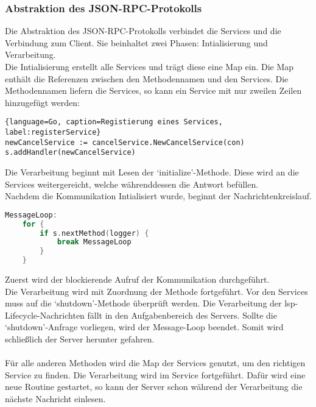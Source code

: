 \documentclass[./einleitung.tex]{subfiles}
\begin{document}
    \subsubsection{Abstraktion des JSON-RPC-Protokolls}
    Die Abstraktion des JSON-RPC-Protokolls verbindet die Services und die Verbindung zum Client.
    Sie beinhaltet zwei Phasen: Intialisierung und Verarbeitung.\\
    Die Intialisierung erstellt alle Services und trägt diese eine Map ein.
    Die Map enthält die Referenzen zwischen den Methodennamen und den Services.
    Die Methodennamen liefern die Services, so kann ein Service mit nur zweilen Zeilen hinzugefügt werden:
    \begin{lstlisting}{language=Go, caption=Registierung eines Services, label:registerService}
newCancelService := cancelService.NewCancelService(con)
s.addHandler(newCancelService)
    \end{lstlisting}
    Die Verarbeitung beginnt mit Lesen der `initialize'-Methode.
    Diese wird an die Services weitergereicht, welche währenddessen die Antwort befüllen.\\
    Nachdem die Kommunikation Intialisiert wurde, beginnt der Nachrichtenkreislauf.
    \begin{lstlisting}[language=Go, caption=Nachrichtenkreislauf, label=lst:messageLopp]
MessageLoop:
	for {
		if s.nextMethod(logger) {
			break MessageLoop
		}
	}
    \end{lstlisting}
    Zuerst wird der blockierende Aufruf der Kommunikation durchgeführt. \\
    Die Verarbeitung wird mit Zuordnung der Methode fortgeführt.
    Vor den Services muss auf die `shutdown'-Methode überprüft werden.
    Die Verarbeitung der \acrshort{lsp}-Lifecycle-Nachrichten fällt in den Aufgabenbereich des Servers.
    Sollte die `shutdown'-Anfrage vorliegen, wird der Message-Loop beendet.
    Somit wird schließlich der Server herunter gefahren.
    \\\\
    Für alle anderen Methoden wird die Map der Services genutzt, um den richtigen Service zu finden.
    Die Verarbeitung wird im Service fortgeführt.
    Dafür wird eine neue Routine gestartet, so kann der Server schon während der Verarbeitung die nächste Nachricht einlesen.
\end{document}
